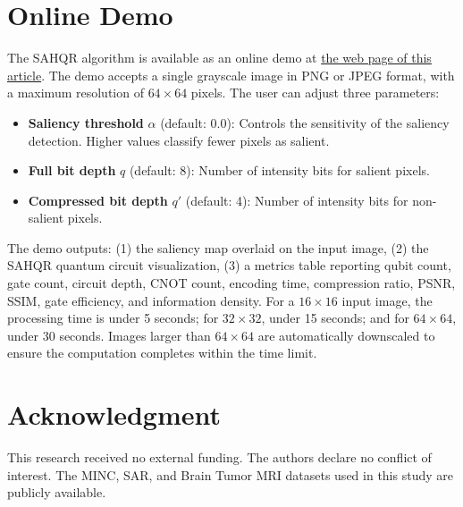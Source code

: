 \documentclass{ipol}
\begin{document}

\section{Online Demo}
\label{sec:online_demo}

The SAHQR algorithm is available as an online demo at \href{\ipolLink}{the web page of this article}. The demo accepts a single grayscale image in PNG or JPEG format, with a maximum resolution of $64 \times 64$ pixels. The user can adjust three parameters:
\begin{itemize}
\item \textbf{Saliency threshold} $\alpha$ (default: 0.0): Controls the sensitivity of the saliency detection. Higher values classify fewer pixels as salient.
\item \textbf{Full bit depth} $q$ (default: 8): Number of intensity bits for salient pixels.
\item \textbf{Compressed bit depth} $q'$ (default: 4): Number of intensity bits for non-salient pixels.
\end{itemize}
The demo outputs: (1) the saliency map overlaid on the input image, (2) the SAHQR quantum circuit visualization, (3) a metrics table reporting qubit count, gate count, circuit depth, CNOT count, encoding time, compression ratio, PSNR, SSIM, gate efficiency, and information density. For a $16 \times 16$ input image, the processing time is under 5 seconds; for $32 \times 32$, under 15 seconds; and for $64 \times 64$, under 30 seconds.  Images larger than $64 \times 64$ are automatically downscaled to ensure the computation completes within the time limit.


\section*{Acknowledgment}
This research received no external funding. The authors declare no conflict of interest. The MINC, SAR, and Brain Tumor MRI datasets used in this study are publicly available.

\end{document}
